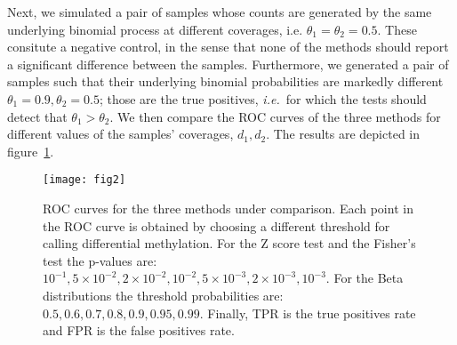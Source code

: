 \documentclass[11pt]{amsart}
\newcommand{\ie}{\textit{i.e.}\ }
\newcommand{\e}[1]{\times 10^{#1}}
\begin{document}
Next, we simulated a pair of samples whose counts are generated by the same underlying binomial process at different coverages, i.e. $\theta_1=\theta_2=0.5$. These consitute a negative control, in the sense that none of the  methods should report a significant difference between the samples. Furthermore, we generated a pair of samples such that their underlying binomial probabilities are markedly different $\theta_1=0.9,\theta_2=0.5$; those are the true positives, \ie for which the tests should detect that $\theta_1>\theta_2$. We then compare the ROC curves of the three methods for different values of the samples' coverages, $d_1,d_2$. 
The results are depicted in figure~\ref{roc}.
\begin{figure}[h]
\caption{ROC curves for the three methods under comparison. Each point in the ROC curve is obtained by choosing a different threshold for calling differential methylation. For the Z score test and the Fisher's test the p-values are: $10^{-1}, 5\e{-2}, 2\e{-2}, 10^{-2}, 5\e{-3}, 2\e{-3}, 10^{-3}$. For the Beta distributions the threshold probabilities are: $0.5, 0.6, 0.7, 0.8, 0.9, 0.95, 0.99$. Finally, TPR is the true positives rate and FPR is the false positives rate.}
\texttt{[image: fig2]}
\label{roc}
\end{figure}
\end{document}
